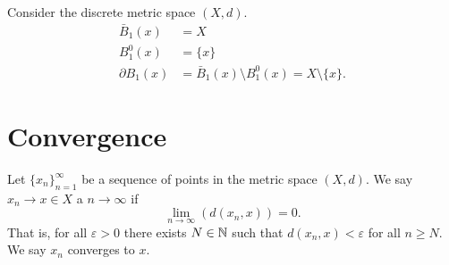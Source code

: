 \begin{example}
    Consider the discrete metric space $(X, d)$.
    \begin{align*}
        \bar B_1(x) &= X \\
        B_1^0(x) &= \{ x \} \\
        \partial B_1(x) &= \bar B_1(x) \setminus B_1^0(x) = X \setminus \{ x \}.
    \end{align*}
\end{example}

\section{Convergence}

\begin{definition}[Convergence]
    Let $\{ x_n \}_{n = 1}^\infty$ be a sequence of points in the metric space $(X, d)$. We say $x_n \to x \in X$ a $n \to \infty$ if
    \[ \lim_{n \to \infty} \left( d(x_n, x) \right) = 0. \]
    That is, for all $\varepsilon > 0 $ there exists $N \in \mathbb{N}$ such that $d(x_n, x) < \varepsilon$ for all $n \geq N$. We say $x_n$ converges to $x$.
\end{definition}
